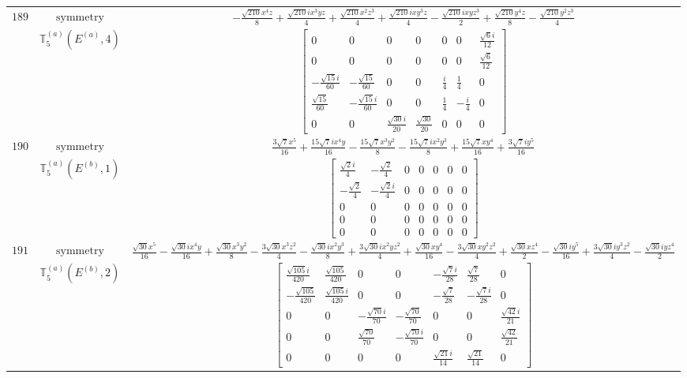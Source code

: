 \documentclass[fleqn,8pt,landscape]{jsarticle}
\begin{document}
\begin{longtable}{ccc}
$ 189 $ & $ \text{symmetry} $ & $ - \frac{\sqrt{210} x^{4} z}{8} + \frac{\sqrt{210} i x^{3} y z}{4} + \frac{\sqrt{210} x^{2} z^{3}}{4} + \frac{\sqrt{210} i x y^{3} z}{4} - \frac{\sqrt{210} i x y z^{3}}{2} + \frac{\sqrt{210} y^{4} z}{8} - \frac{\sqrt{210} y^{2} z^{3}}{4} $ \\
$  $ & $ \mathbb{T}_{5}^{(a)}(E^{(a)},4) $ & $ \begin{bmatrix} 0 & 0 & 0 & 0 & 0 & 0 & \frac{\sqrt{6} i}{12} \\ 0 & 0 & 0 & 0 & 0 & 0 & \frac{\sqrt{6}}{12} \\ - \frac{\sqrt{15} i}{60} & - \frac{\sqrt{15}}{60} & 0 & 0 & \frac{i}{4} & \frac{1}{4} & 0 \\ \frac{\sqrt{15}}{60} & - \frac{\sqrt{15} i}{60} & 0 & 0 & \frac{1}{4} & - \frac{i}{4} & 0 \\ 0 & 0 & \frac{\sqrt{30} i}{20} & \frac{\sqrt{30}}{20} & 0 & 0 & 0 \end{bmatrix} $ \\ \hline
$ 190 $ & $ \text{symmetry} $ & $ \frac{3 \sqrt{7} x^{5}}{16} + \frac{15 \sqrt{7} i x^{4} y}{16} - \frac{15 \sqrt{7} x^{3} y^{2}}{8} - \frac{15 \sqrt{7} i x^{2} y^{3}}{8} + \frac{15 \sqrt{7} x y^{4}}{16} + \frac{3 \sqrt{7} i y^{5}}{16} $ \\
$  $ & $ \mathbb{T}_{5}^{(a)}(E^{(b)},1) $ & $ \begin{bmatrix} \frac{\sqrt{2} i}{4} & - \frac{\sqrt{2}}{4} & 0 & 0 & 0 & 0 & 0 \\ - \frac{\sqrt{2}}{4} & - \frac{\sqrt{2} i}{4} & 0 & 0 & 0 & 0 & 0 \\ 0 & 0 & 0 & 0 & 0 & 0 & 0 \\ 0 & 0 & 0 & 0 & 0 & 0 & 0 \\ 0 & 0 & 0 & 0 & 0 & 0 & 0 \end{bmatrix} $ \\ \hline
$ 191 $ & $ \text{symmetry} $ & $ \frac{\sqrt{30} x^{5}}{16} - \frac{\sqrt{30} i x^{4} y}{16} + \frac{\sqrt{30} x^{3} y^{2}}{8} - \frac{3 \sqrt{30} x^{3} z^{2}}{4} - \frac{\sqrt{30} i x^{2} y^{3}}{8} + \frac{3 \sqrt{30} i x^{2} y z^{2}}{4} + \frac{\sqrt{30} x y^{4}}{16} - \frac{3 \sqrt{30} x y^{2} z^{2}}{4} + \frac{\sqrt{30} x z^{4}}{2} - \frac{\sqrt{30} i y^{5}}{16} + \frac{3 \sqrt{30} i y^{3} z^{2}}{4} - \frac{\sqrt{30} i y z^{4}}{2} $ \\
$  $ & $ \mathbb{T}_{5}^{(a)}(E^{(b)},2) $ & $ \begin{bmatrix} \frac{\sqrt{105} i}{420} & \frac{\sqrt{105}}{420} & 0 & 0 & - \frac{\sqrt{7} i}{28} & \frac{\sqrt{7}}{28} & 0 \\ - \frac{\sqrt{105}}{420} & \frac{\sqrt{105} i}{420} & 0 & 0 & - \frac{\sqrt{7}}{28} & - \frac{\sqrt{7} i}{28} & 0 \\ 0 & 0 & - \frac{\sqrt{70} i}{70} & - \frac{\sqrt{70}}{70} & 0 & 0 & \frac{\sqrt{42} i}{21} \\ 0 & 0 & \frac{\sqrt{70}}{70} & - \frac{\sqrt{70} i}{70} & 0 & 0 & \frac{\sqrt{42}}{21} \\ 0 & 0 & 0 & 0 & \frac{\sqrt{21} i}{14} & \frac{\sqrt{21}}{14} & 0 \end{bmatrix} $ \\ \hline

\end{longtable}
\end{document}
